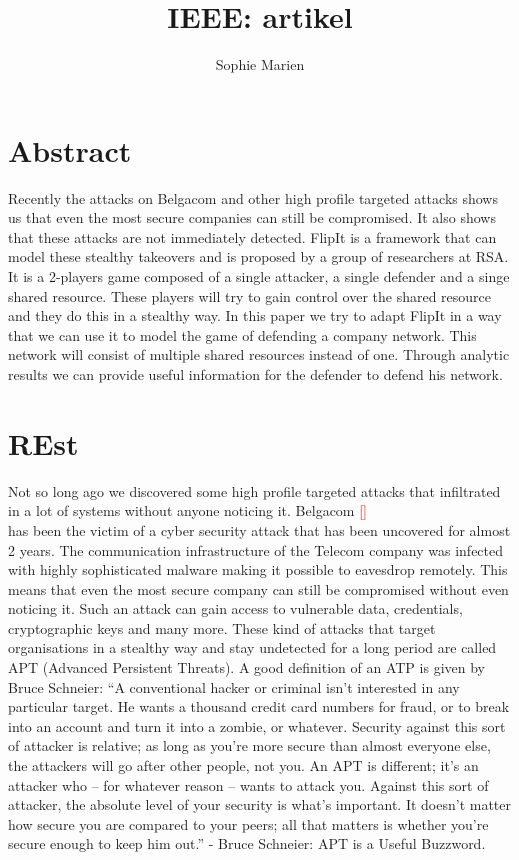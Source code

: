 \documentclass[a4paper, 11pt]{article}
\newcommand{\comment}[1]{\textcolor{red}{#1}\\}
\begin{document}
\begin{titlepage}
\title{IEEE: artikel}
\author{Sophie Marien}
\date{} 
\end{titlepage}



\maketitle
\section*{Abstract}
Recently the attacks on Belgacom and other high profile targeted attacks shows us that even the most secure companies can still be compromised. It also shows that these attacks are not immediately detected. FlipIt is a framework that can model these stealthy takeovers and is proposed by a group of researchers at RSA. It is a 2-players game composed of a single attacker, a single defender and a singe shared resource. These players will try to gain control over the shared resource and they do this in a stealthy way. In this paper we try to adapt FlipIt in a way that we can use it to model the game of defending a company network. This network will consist of multiple shared resources instead of one. Through analytic results we can provide useful information for the defender to defend his network.


\section{REst}
 
 Not so long ago we discovered some high profile targeted attacks that infiltrated in a lot of systems without anyone noticing it. Belgacom \comment{[]} has been the victim of a cyber security attack that has been uncovered for almost 2 years. The communication infrastructure of the Telecom company was infected with highly sophisticated malware making it possible to eavesdrop remotely. This means that even the most secure company can still be compromised without even noticing it. Such an attack can gain access to vulnerable data, credentials, cryptographic keys and many more. These kind of attacks that target organisations in a stealthy way and stay undetected for a long period are called APT (Advanced Persistent Threats). A good definition of an ATP is given by Bruce Schneier:
 “A conventional hacker or criminal isn't interested in any particular target. He wants a thousand credit card numbers for fraud, or to break into an account and turn it into a zombie, or whatever. Security against this sort of attacker is relative; as long as you're more secure than almost everyone else, the attackers will go after other people, not you. An APT is different; it's an attacker who – for whatever reason – wants to attack you. Against this sort of attacker, the absolute level of your security is what's important. It doesn't matter how secure you are compared to your peers; all that matters is whether you're secure enough to keep him out.” - Bruce Schneier: APT is a Useful Buzzword.
 
\end{document}
